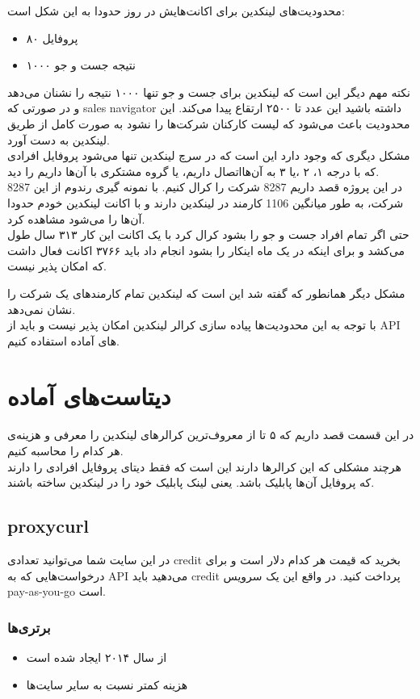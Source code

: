 محدودیت‌های لینکدین برای اکانت‌هایش در روز حدودا به این شکل است:
\begin{itemize}
    \item ۸۰ پروفایل
    \item ۱۰۰۰ نتیجه جست و جو
\end{itemize}
نکته مهم دیگر این است که لینکدین برای جست و جو تنها ۱۰۰۰ نتیجه را نشنان می‌دهد و در صورتی که sales navigator داشته باشید این عدد تا ۲۵۰۰ ارتقاع پیدا می‌کند. این محدودیت باعث می‌شود که لیست کارکنان شرکت‌ها را نشود به صورت کامل از طریق لینکدین به دست آورد.\\
مشکل دیگری که وجود دارد این است که در سرچ لینکدین تنها می‌شود پروفایل افرادی که با درجه ۱، ۲ ،یا ۳ به آن‌هااتصال داریم، یا گروه مشتکری با آن‌ها داریم را دید.\\
در این پروژه قصد داریم 8287 شرکت را کرال کنیم. با نمونه گیری رندوم از این 8287 شرکت، به طور میانگین 1106 کارمند در لینکدین دارند و با اکانت لینکدین خودم حدودا
آن‌ها را می‌شود مشاهده کرد.\\
حتی اگر تمام افراد جست و جو را بشود کرال کرد با یک اکانت این کار ۳۱۳ سال طول می‌کشد و برای اینکه در یک ماه اینکار را بشود انجام داد باید ۳۷۶۶ اکانت فعال داشت که امکان پذیر نیست.

مشکل دیگر همانطور که گفته شد این است که لینکدین تمام کارمند‌های یک شرکت را نشان نمی‌دهد.\\
با توجه به این محدودیت‌ها پیاده سازی کرالر لینکدین امکان پذیر نیست و باید از API های آماده استفاده کنیم.

\section{دیتاست‌های آماده} 
در این قسمت قصد داریم که ۵ تا از معروف‌ترین کرالر‌های لینکدین را معرفی و هزینه‌ی هر کدام را محاسبه کنیم. \\
هرچند مشکلی که این کرالرها دارند این است که فقط دیتای پروفایل افرادی را دارند که پروفایل آن‌ها پابلیک باشد. یعنی لینک پابلیک خود را در لینکدین ساخته باشند.

\subsection{proxycurl}
در این سایت شما می‌توانید تعدادی credit بخرید که قیمت هر کدام  دلار است و برای درخواست‌هایی که به API می‌دهید باید credit پرداخت کنید. در واقع این یک سرویس pay-as-you-go است.\\

\subsubsection{برتری‌ها}
\begin{itemize}
    \item از سال ۲۰۱۴ ایجاد شده است
    \item هزینه کمتر نسبت به سایر سایت‌ها
\end{itemize}
